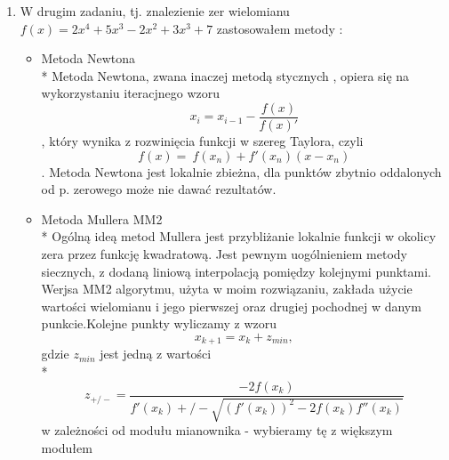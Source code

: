 \documentclass[a4paper, 11pt]{article}
\begin{document}
\begin{enumerate}
\begin{enumerate}
\begin{itemize}
\end{itemize}
\item W drugim zadaniu, tj. znalezienie zer wielomianu \( f(x) = 2x^4 + 5x^3 - 2x^2 +3x^3 +7 \) zastosowałem metody : 
\begin{itemize}
 \item Metoda Newtona \\* Metoda Newtona, zwana inaczej metodą stycznych , opiera się na wykorzystaniu iteracjnego wzoru \[ x_i = x_{i-1} - \dfrac{f(x)}{f(x)'} \] , który wynika z rozwinięcia funkcji w szereg Taylora, czyli  \[f(x) =~f(x_n) +f'(x_n)(x-x_n) \] . Metoda Newtona jest lokalnie zbieżna, dla punktów zbytnio oddalonych od p. zerowego może nie dawać rezultatów.
\item Metoda Mullera MM2 \\* Ogólną ideą metod Mullera jest przybliżanie lokalnie funkcji w okolicy zera przez funkcję kwadratową. Jest pewnym uogólnieniem metody siecznych, z dodaną liniową interpolacją pomiędzy kolejnymi punktami. Werjsa MM2 algorytmu, użyta w moim rozwiązaniu, zakłada użycie wartości wielomianu i jego pierwszej oraz drugiej pochodnej w danym punkcie.Kolejne punkty wyliczamy z wzoru \[ x_{k+1} = x_k + z_{min} , \] gdzie \(z_{min}\) jest jedną z wartości  \\* \[ z_{+/-} = \dfrac{-2f(x_k)}{f'(x_k) +/- \sqrt{(f'(x_k))^2 - 2f(x_k)f''(x_k)}} \] w zależności od modułu mianownika - wybieramy tę z większym modułem
\end{itemize}
\end{enumerate}


\end{enumerate}
\end{document}
